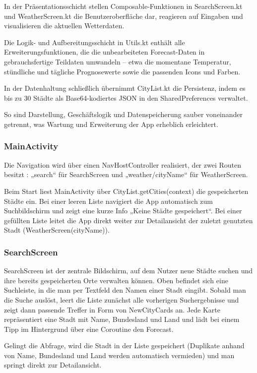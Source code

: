 \documentclass{article}
\begin{document}
In der Präsentationsschicht stellen Composable-Funktionen in SearchScreen.kt und WeatherScreen.kt die Benutzeroberfläche dar, reagieren auf Eingaben und visualisieren die aktuellen Wetterdaten.

Die Logik- und Aufbereitungsschicht in Utils.kt enthält alle Erweiterungsfunktionen, die die unbearbeiteten Forecast-Daten in gebrauchsfertige Teildaten umwandeln – etwa die momentane Temperatur, stündliche und tägliche Prognosewerte sowie die passenden Icons und Farben.

In der Datenhaltung schließlich übernimmt CityList.kt die Persistenz, indem es bis zu 30 Städte als Base64-kodiertes JSON in den SharedPreferences verwaltet.

So sind Darstellung, Geschäftslogik und Datenspeicherung sauber voneinander getrennt, was Wartung und Erweiterung der App erheblich erleichtert.

\subsubsection{MainActivity}
Die Navigation wird über einen NavHostController realisiert, der zwei Routen besitzt : „search“ für SearchScreen und „weather/{cityName}“ für WeatherScreen.

Beim Start liest MainActivity über CityList.getCities(context) die gespeicherten Städte ein. Bei einer leeren Liste navigiert die App automatisch zum Suchbildschirm und zeigt eine kurze Info „Keine Städte gespeichert“. Bei einer gefüllten Liste leitet die App direkt weiter zur Detailansicht der zuletzt genutzten Stadt (WeatherScreen(cityName)).

\subsubsection{SearchScreen}
SearchScreen ist der zentrale Bildschirm, auf dem Nutzer neue Städte suchen und ihre bereits gespeicherten Orte verwalten können. Oben befindet sich eine Suchleiste, in die man per Textfeld den Namen einer Stadt eingibt. Sobald man die Suche auslöst, leert die Liste zunächst alle vorherigen Suchergebnisse und zeigt dann passende Treffer in Form von NewCityCards an. Jede Karte repräsentiert eine Stadt mit Name, Bundesland und Land und lädt bei einem Tipp im Hintergrund über eine Coroutine den Forecast.

Gelingt die Abfrage, wird die Stadt in der Liste gespeichert (Duplikate anhand von Name, Bundesland und Land werden automatisch vermieden) und man springt direkt zur Detailansicht.
\end{document}
